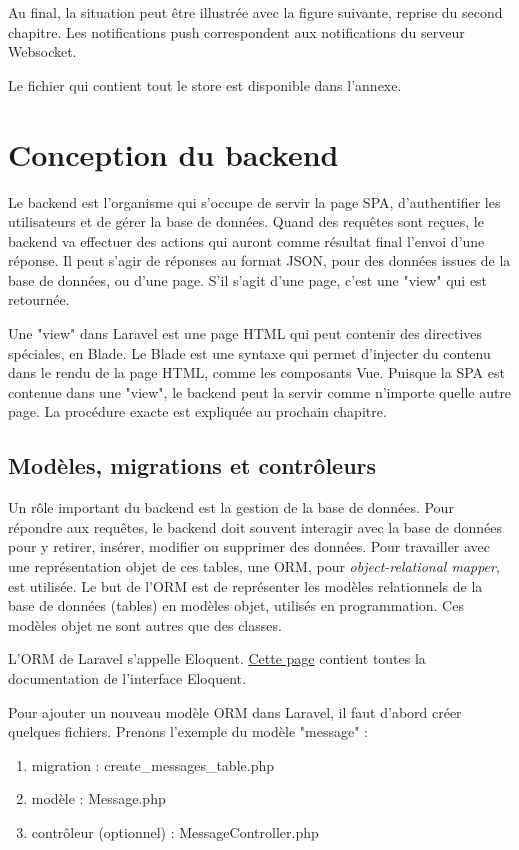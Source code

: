 \documentclass[
    iai, %
    eai, %
]{heig-tb}
\begin{document}
Au final, la situation peut être illustrée avec la figure suivante, reprise du second chapitre.
Les notifications push correspondent aux notifications du serveur Websocket.

Le fichier qui contient tout le store est disponible dans l'annexe.

\newpage
\chapter{Conception du backend}
Le backend est l'organisme qui s'occupe de servir la page SPA, d'authentifier les utilisateurs et de gérer la base de données.
Quand des requêtes sont reçues, le backend va effectuer des actions qui auront comme résultat final l'envoi d'une réponse. Il peut s'agir de réponses au format JSON, pour des données issues de la base de données, ou d'une page. S'il s'agit d'une page, c'est une "view" qui est retournée.

Une "view" dans Laravel est une page HTML qui peut contenir des directives spéciales, en Blade. Le Blade est une syntaxe qui permet d'injecter du contenu dans le rendu de la page HTML, comme les composants Vue. Puisque la SPA est contenue dans une "view", le backend peut la servir comme n'importe quelle autre page. La procédure exacte est expliquée au prochain chapitre.

\section{Modèles, migrations et contrôleurs}
Un rôle important du backend est la gestion de la base de données. Pour répondre aux requêtes, le backend doit souvent interagir avec la base de données pour y retirer, insérer, modifier ou supprimer des données. Pour travailler avec une représentation objet de ces tables, une ORM, pour \emph{object-relational mapper}, est utilisée. Le but de l'ORM est de représenter les modèles relationnels de la base de données (tables) en modèles objet, utilisés en programmation. Ces modèles objet ne sont autres que des classes.

L'ORM de Laravel s'appelle Eloquent. \href{https://laravel.com/docs/8.x/eloquent}{Cette page} contient toutes la documentation de l'interface Eloquent.

Pour ajouter un nouveau modèle ORM dans Laravel, il faut d'abord créer quelques fichiers. Prenons l'exemple du modèle "message" :
\begin{enumerate}
  \item migration : create\_messages\_table.php
  \item modèle : Message.php
  \item contrôleur (optionnel) : MessageController.php
\end{enumerate}
\bigskip
\end{document}
